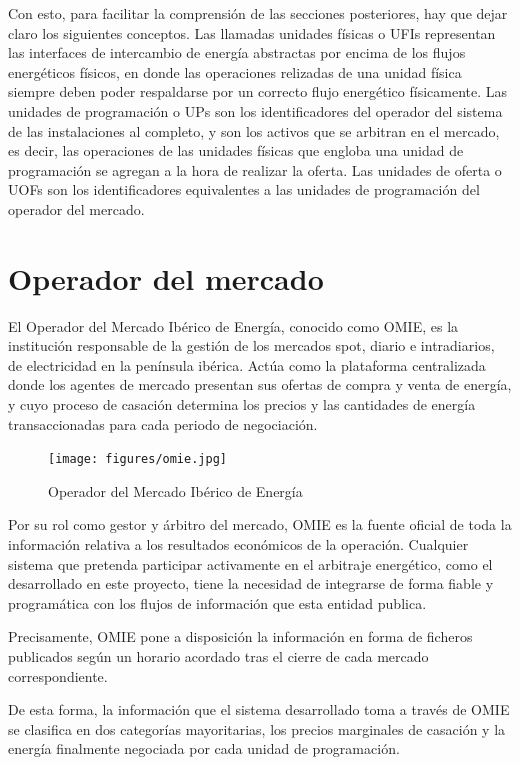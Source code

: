 Con esto, para facilitar la comprensión de las secciones posteriores, hay que dejar claro los siguientes conceptos. Las llamadas unidades físicas o UFIs representan las interfaces de intercambio de energía abstractas por encima de los flujos energéticos físicos, en donde las operaciones relizadas de una unidad física siempre deben poder respaldarse por un correcto flujo energético físicamente. Las unidades de programación o UPs son los identificadores del operador del sistema de las instalaciones al completo, y son los activos que se arbitran en el mercado, es decir, las operaciones de las unidades físicas que engloba una unidad de programación se agregan a la hora de realizar la oferta. Las unidades de oferta o UOFs son los identificadores equivalentes a las unidades de programación del operador del mercado.

\section{Operador del mercado}
\label{makereference4.1}

El Operador del Mercado Ibérico de Energía, conocido como OMIE, es la institución responsable de la gestión de los mercados spot, diario e intradiarios, de electricidad en la península ibérica. Actúa como la plataforma centralizada donde los agentes de mercado presentan sus ofertas de compra y venta de energía, y cuyo proceso de casación determina los precios y las cantidades de energía transaccionadas para cada periodo de negociación.

\begin{figure}
\centering
\texttt{[image: figures/omie.jpg]}
\caption{Operador del Mercado Ibérico de Energía}
\label{fig:omie}
\end{figure}

Por su rol como gestor y árbitro del mercado, OMIE es la fuente oficial de toda la información relativa a los resultados económicos de la operación. Cualquier sistema que pretenda participar activamente en el arbitraje energético, como el desarrollado en este proyecto, tiene la necesidad de integrarse de forma fiable y programática con los flujos de información que esta entidad publica.

Precisamente, OMIE pone a disposición la información en forma de ficheros publicados según un horario acordado tras el cierre de cada mercado correspondiente.

De esta forma, la información que el sistema desarrollado toma a través de OMIE se clasifica en dos categorías mayoritarias, los precios marginales de casación y la energía finalmente negociada por cada unidad de programación.

